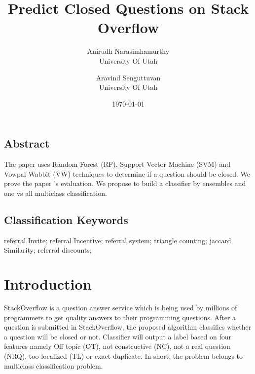 \documentclass[letterpaper,twocolumn,11pt]{article}
\begin{document}
\date{\today}

\title{\Large \bf  Predict Closed Questions on Stack Overflow}

\author{
{\rm Anirudh Narasimhamurthy}\\
University Of Utah
\and
{\rm Aravind Senguttuvan}\\
University Of Utah
} %

\maketitle

\thispagestyle{empty}

\subsection*{Abstract}
The paper \cite{Lezina_predictclosed} uses Random Forest (RF), Support Vector Machine (SVM) and Vowpal Wabbit (VW) techniques to determine if a question should be closed. We prove the paper \cite{Lezina_predictclosed}’s evaluation.
We propose to build a classifier by ensembles and one vs all multiclass classification.

\subsection*{Classification Keywords}
referral Invite; referral Incentive; referral system; triangle counting; jaccard Similarity; referral discounts;

\section{Introduction}
StackOverflow is a question answer service which is being used by millions of programmers to get quality answers to their programming questions. After a question is submitted in StackOverflow, the proposed algorithm classifies whether a 
question will be closed or not. Classifier will output a label based on four features namely Off 
topic (OT), not constructive (NC), not a real question (NRQ), too localized (TL) or exact duplicate.
In short, the problem belongs to multiclass classification problem.
\end{document}
